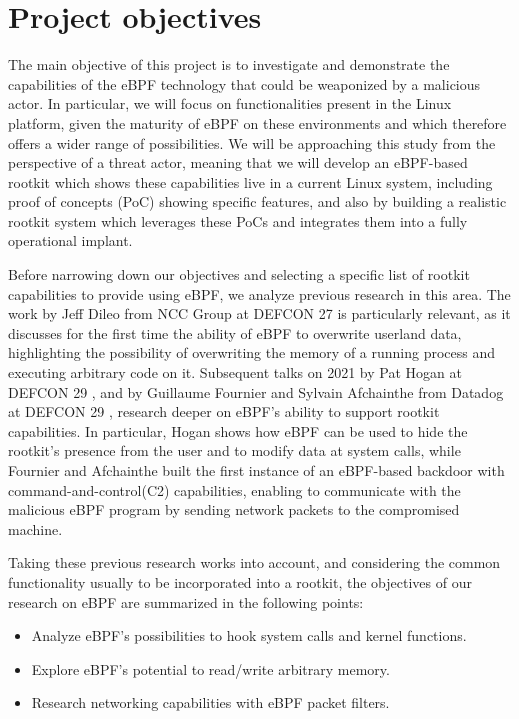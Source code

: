 \section{Project objectives} \label{section:project_objectives}
The main objective of this project is to investigate and demonstrate the capabilities of
the eBPF technology that could be weaponized by a malicious actor. In
particular, we will focus on functionalities present in the Linux platform,
given the maturity of eBPF on these environments and which therefore offers
a wider range of possibilities. We will be approaching this study from the
perspective of a threat actor, meaning that we will develop an eBPF-based
rootkit which shows these capabilities live in a current Linux system,
including proof of concepts (PoC) showing specific features, and also by
building a realistic rootkit system which leverages these PoCs and
integrates them into a fully operational implant.

Before narrowing down our objectives and selecting a specific list of
rootkit capabilities to provide using eBPF, we analyze previous research in
this area. The work by Jeff Dileo from NCC Group at DEFCON 27
\cite{evil_ebpf} is particularly relevant, as it discusses for the first
time the ability of eBPF to overwrite userland data, highlighting the
possibility of overwriting the memory of a running process and executing
arbitrary code on it.
%
Subsequent talks on 2021 by Pat Hogan at DEFCON 29 \cite{bad_ebpf}, and by
Guillaume Fournier and Sylvain Afchainthe from Datadog at DEFCON 29
\cite{ebpf_friends}, research deeper on eBPF's ability to support rootkit
capabilities. In particular, Hogan shows how eBPF can be used to hide the
rootkit's presence from the user and to modify data at system calls, while
Fournier and Afchainthe built the first instance of an eBPF-based backdoor
with command-and-control(C2) capabilities, enabling to communicate with
the malicious eBPF program by sending network packets to the compromised
machine.

Taking these previous research works into account, and considering the
common functionality usually to be incorporated into a rootkit, the
objectives of our research on eBPF are summarized in the following points:
\begin{itemize}
\item Analyze eBPF's possibilities to hook system calls and kernel
functions.
\item Explore eBPF's potential to read/write arbitrary memory.
\item Research networking capabilities with eBPF packet filters.
\end{itemize}

